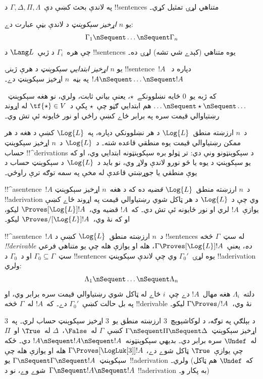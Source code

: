\documentclass[../../../include/open-logic-section]{subfiles}
\begin{document}


په لاندې بحث کښې دې~$\Gamma, \Delta, \Pi, \Lambda$ د
!!{sentence}s متناهي لړۍ تمثيل کړي۔

\begin{defn}[سېکوېنټ]
يو \emph{$n$ اړخيز سېکوېنټ} د لاندې بڼې عبارت دے:
\[
\Gamma_1 \nSequent \dots \nSequent \Gamma_n
\]
چې هره~$\Gamma_i$ د ژبې~$\Lang L$ د !!{sentence}s يوه متناهي
(کېدے شي تشه) لړۍ ده۔
\end{defn}

\begin{defn}
يو \emph{$n$ اړخيز ابتدايي سېکوېنټ} د هرې ژبنۍ !!{sentence}~$!A$
دپاره د~$!A \nSequent \dots \nSequent !A$ په بڼه~$n$ اړخيز
سېکوېنټ دے۔

که ژبه يو~$0$ ځايه نښلوونکے~$\star$، يعنې بياني ثابت، ولري، نو
هغه سېکوېنټ~$\dots \nSequent \star \nSequent \dots$ هم ابتدايي
ګڼو چې~$\star$ پکې د~$\tf{\star} \in V$ له اړوند رښتياوالي
قيمت سره په برابر ځاے کښې راځي او نور ځايونه ئې تش وي۔
\end{defn}

د~$n$ ارزښته منطق~$\Log{L}$ د هر نښلوونکي دپاره، په~$\Log{L}$ کښې
د هغه د هر ممکن رښتياوالي قيمت يوه منطقي قاعده شته۔ د~$\Log{L}$ د~$n$ اړخيز
سېکوېنټ حساب !!^{derivation}s د سېکوېنټونو ونې دي: تر ټولو بره
سېکوېنټونه ابتدايي وي، او که يو سېکوېنټ د يوه يا څو نورو لاندې
ولاړ وي، نو بايد د~$\Log{L}$ د سېکوېنټ حساب د يوې منطقي يا
جوړښتي قاعدې له مخې په سمه توګه ترې راوځي۔

\begin{defn}[قضيې]
!!^a{sentence}~$!A$ د~$n$ ارزښته منطق~$\Log{L}$ \emph{قضيه}
ده که د هغه~$n$ اړخيز سېکوېنټ !!a{derivation} وي چې د~$\Log{L}$
د هر ټاکل شوي رښتياوالي قيمت په اړوند ځاے کښې يوازې~$!A$ لري
او نور ځايونه ئې تش دي۔ که~$!A$
قضيه وي،~$\Proves[\Log{L}] !A$ ليکو، او که نۀ وي،~$\Proves/[\Log{L}]
!A$ ليکو۔
\end{defn}

\begin{defn}[!!^{derivability}]
!!^a{sentence}~$!A$ د~$n$ ارزښته منطق~$\Log{L}$ کښې د
!!{sentence}s له سټ~$\Gamma$ څخه \emph{!!{derivable} ده}، يعنې~$\Gamma
\Proves[\Log{L}] !A$، هله او يوازې هله چې يو متناهي
فرعي سټ~$\Gamma_0 \subseteq \Gamma$ او د~$\Gamma_0$ د
!!{sentence}s يوه لړۍ~$\Gamma_0'$ وي چې لاندې سېکوېنټ
!!a{derivation} ولري:
\[ \Lambda_1 \nSequent \dots \nSequent \Lambda_n \]
دلته~$\Lambda_i$ هغه مهال~$!A$ دے چې~$i$ ځاے له ټاکل شوي
رښتياوالي قيمت سره برابر وي، او په بل حالت کښې~$\Gamma_0'$ دے۔
که~$!A$ له~$\Gamma$ څخه !!{derivable} نۀ وي،~$\Gamma \Proves/ !A$
ليکو۔
\end{defn}

د بېلګې په توګه، د لوکاشېوېچ~$3$ ارزښته منطق يو~$3$ اړخيز
سېکوېنټ حساب لري۔ په~$3$ اړخيز سېکوېنټ~$\Gamma \nSequent \Pi
\nSequent \Delta$ کښې~$\Gamma$ له~$\False$،~$\Delta$ له~$\True$
او~$\Pi$ له~$\Undef$ سره برابر دي۔ بديهي سېکوېنټونه~$!A
\nSequent !A \nSequent !A$ دي۔ ځکه چې يوازې~$\True$ ټاکل شوے دے،
$\Gamma \Proves[\LogLuk[3]] !A$ هله او يوازې هله چې سېکوېنټ~$\Gamma
\nSequent \Gamma \nSequent !A$ يو~!!a{derivation} ولري۔ (که~$\Undef$
هم ټاکل شوے وے، نو د~$\Gamma \nSequent !A \nSequent !A$
!!a{derivation} به پکار و۔)
\end{document}
